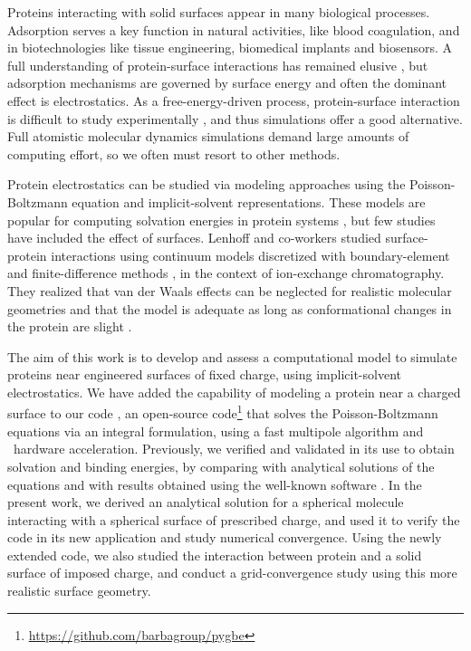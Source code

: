 
Proteins interacting with solid surfaces appear in many biological processes. Adsorption serves a key function in natural activities, like blood coagulation, and  in biotechnologies like tissue engineering, biomedical implants and biosensors.
A full understanding of protein-surface interactions has remained elusive \cite{Gray2004,RabeVerdesSeegel2011}, but adsorption mechanisms are governed by surface energy and often the dominant effect is electrostatics. As a free-energy-driven process, protein-surface interaction is difficult to study experimentally \cite{MijajlovicETal2013}, and thus simulations offer a good alternative. Full atomistic molecular dynamics simulations demand large amounts of computing effort, so we often must resort to other methods.

Protein electrostatics can be studied via modeling approaches using the Poisson-Boltzmann equation and implicit-solvent representations. These models  are popular for computing solvation energies in protein systems \cite{RouxSimonson1999,Bardhan2012}, but few studies have included the effect of surfaces. Lenhoff and co-workers studied surface-protein interactions using continuum models discretized with boundary-element \cite{YoonLenhoff1992,RothLenhoff1993,AsthagiriLenhoff1997} and finite-difference methods \cite{YaoLenhoff2004,YaoLenhoff2005}, in the context of ion-exchange chromatography. They realized that van der Waals effects can be neglected for realistic molecular geometries \cite{RothNealLenhoff1996} and that the model is adequate as long as conformational changes in the protein are slight \cite{YaoLenhoff2004,YaoLenhoff2005}. 

The aim of this work is to develop and assess a computational model to simulate proteins near engineered surfaces of fixed charge, using implicit-solvent electrostatics.
We have added the capability of modeling a protein near a charged surface to our code \pygbe, an open-source code\footnote{\url{https://github.com/barbagroup/pygbe}}  that solves the Poisson-Boltzmann equations via an integral formulation, using a fast multipole algorithm and \gpu\ hardware acceleration.  Previously, we verified and validated \pygbe in its use to obtain solvation and binding energies, by comparing with analytical solutions of the equations and with results obtained using the well-known \apbs software \cite{CooperBarba-share154331,CooperBardhanBarba2013}. 
In the present work, we derived an analytical solution for a spherical molecule interacting with a spherical surface of prescribed charge, and used it to verify the code in its new application and study numerical convergence.
Using the newly extended code, we also studied the interaction between protein \gb and a solid surface of imposed charge, 
and conduct a grid-convergence study using this more realistic surface geometry.

